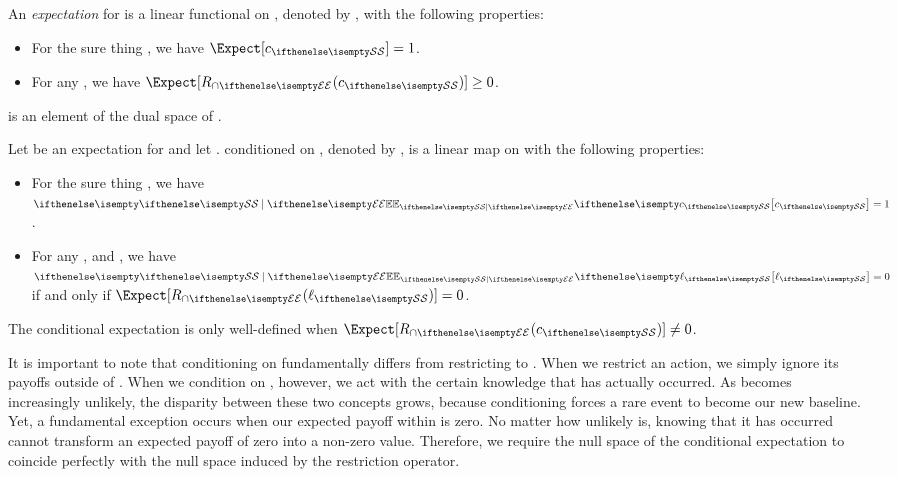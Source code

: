 \begin{definition} [Expectation]
    An \emph{expectation} for \sampleSet is a linear functional on \actionSet, denoted by \Expect, with the
    following properties:
    \begin{itemize}
        \item For the sure thing \sure, we have $\Expect[{\sure}] = 1$.
        \item For any \eventInS, we have $\Expect[\rstOp(\sure)] \geq 0$.
    \end{itemize}
\end{definition}

\begin{proposition}
    \Expect is an element of the dual space of \actionSet.
\end{proposition}

\begin{definition} 
    Let \Expect be an expectation for \sampleSet and let \eventInS.
    \Expect conditioned on \event, denoted by \ExpectOnE, is a linear map on \sampleSet with the following properties:
    \begin{itemize}
        \item For the sure thing \sure, we have $\ExpectOnE[{\sure}] = 1$.
        \item For any \inA{\act}, and \eventInS,
        we have $\ExpectOnE[{\act}] = 0$ if and only if $\Expect[\rstOp(\act)] = 0$.
    \end{itemize}
\end{definition}

\begin{proposition}
    The conditional expectation \ExpectOnE is only well-defined when $\Expect[\rstOp(\sure)] \neq 0$.
\end{proposition}

It is important to note that conditioning on \event fundamentally differs from restricting to \event.
When we restrict an action, we simply ignore its payoffs outside of \event.
When we condition on \event, however, we act with the certain knowledge that \event has actually occurred.
As \event becomes increasingly unlikely, the disparity between these two concepts grows, because conditioning forces a
rare event to become our new baseline.
Yet, a fundamental exception occurs when our expected payoff within \event is zero.
No matter how unlikely \event is, knowing that it has occurred cannot transform an expected payoff of zero into a
non-zero value.
Therefore, we require the null space of the conditional expectation to
coincide perfectly with the null space induced by the restriction operator.

